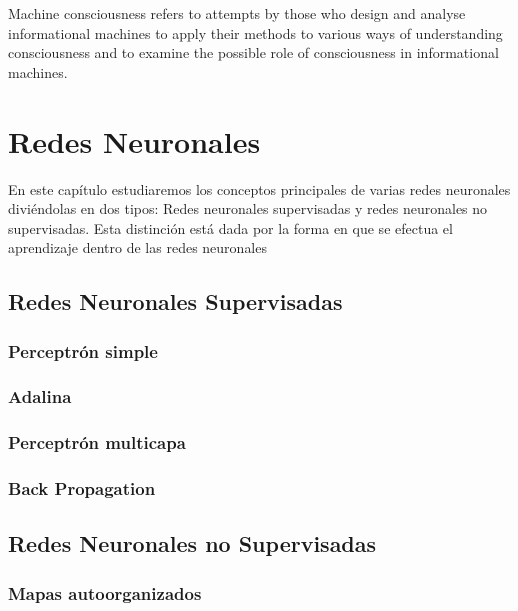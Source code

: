 \begin{savequote}[72mm]
  Machine consciousness refers to attempts by those who design and
  analyse informational machines to apply their methods to various
  ways of understanding consciousness and to examine the possible role
  of consciousness in informational machines.

\end{savequote}

\chapter{Redes Neuronales}
\label{cha:redes}

En este capítulo estudiaremos los conceptos principales de varias
redes neuronales diviéndolas en dos tipos: Redes neuronales
supervisadas y redes neuronales no supervisadas. Esta distinción está
dada por la forma en que se efectua el aprendizaje dentro de las redes neuronales
\section{Redes Neuronales Supervisadas}



\subsection{Perceptrón simple}



\subsection{Adalina}


\subsection{Perceptrón multicapa}


\subsection{Back Propagation}


\section{Redes Neuronales no Supervisadas}


\subsection{Mapas autoorganizados}


